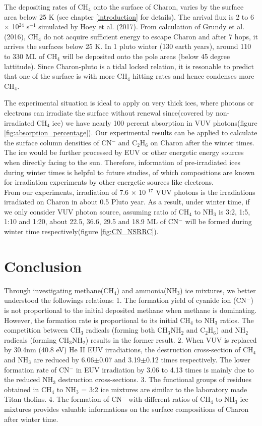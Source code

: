 The depositing rates of CH$_4$ onto the surface of Charon, varies by the surface area below 25 K (see chapter \ref{introduction} for details). The arrival flux is 2 to 6 $\times$ 10$^{24}$ s$^{-1}$ simulated by Hoey et al. (2017)\cite{hoey2017rarefied}. From calculation of Grundy et al. (2016), CH$_4$ do not acquire sufficient energy to escape Charon and after 7 hops, it arrives the surfaces below 25 K. In 1 pluto winter (130 earth years), around 110 to 330 ML of CH$_4$ will be deposited onto the pole areas (below 45 degree lattitude). Since Charon-pluto is a tidal locked relation, it is resonable to predict that one of the surface is with more CH$_4$ hitting rates and hence condenses more CH$_4$.

The experimental situation is ideal to apply on very thick ices, where photons or electrons can irradiate the surface without renewal since(covered by non-irradiated CH$_4$ ice) we have nearly 100 percent absorption in VUV photons(figure \ref{fig:absorption_percentage}). Our experimental results can be applied to calculate the surface column densities of CN$^-$ and C$_2$H$_6$ on Charon after the winter times. The ice would be further processed by EUV or other energetic energy sources when directly facing to the sun. Therefore, information of pre-irradiated ices during winter times is helpful to future studies, of which compositions are known for irradiation experiments by other energetic sources like electrons.\\

From our experiments, irradiation of 7.6 $\times$ 10 $^{17}$ VUV photons is the irradiations irradiated on Charon in about 0.5 Pluto year. As a result, under winter time, if we only consider VUV photon source, assuming ratio of CH$_4$ to NH$_3$ is 3:2, 1:5, 1:10 and 1:20, about 22.5, 36.6, 29.5 and 18.9 ML of CN$^-$ will be formed during winter time respectively(figure \ref{fig:CN_NSRRC}).



\section{Conclusion}
Through investigating methane(CH$_4$) and ammonia(NH$_3$) ice mixtures, we better understood the followings relations: 1. The formation yield of cyanide ion (CN$^-$) is not proportional to the initial deposited methane when methane is dominating. However, the formation rate is proportional to its initial CH$_4$ to NH$_3$ ratios. The competition between CH$_3$ radicals (forming both CH$_3$NH$_2$ and C$_2$H$_6$) and NH$_2$ radicals (forming CH$_3$NH$_2$) results in the former result. 2. When VUV is replaced by 30.4nm (40.8 eV) He II EUV irradiations, the destruction cross-section of CH$_4$ and NH$_3$ are reduced by  6.06$\pm$0.07 and 3.19$\pm$0.12 times respectively. The lower formation rate of CN$^-$ in EUV irradiation by 3.06 to 4.13 times is mainly due to the reduced NH$_3$ destruction cross-sections. 3. The functional groups of residues obtained in CH$_4$ to NH$_3$ = 3:2 ice mixtures are similar to the laboratory made Titan tholins. 4. The formation of CN$^-$ with different ratios of CH$_4$ to NH$_3$ ice mixtures provides valuable informations on the surface compositions of Charon after winter time.

